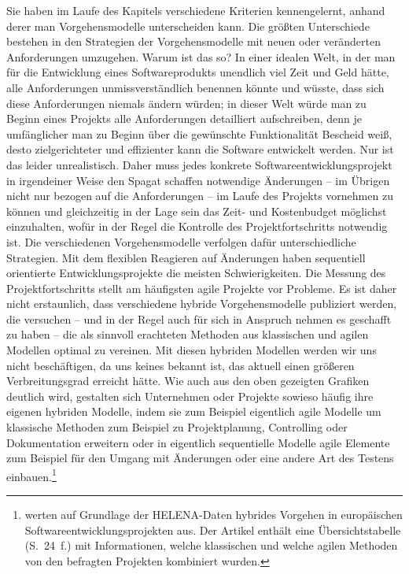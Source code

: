 
Sie haben im Laufe des Kapitels verschiedene Kriterien kennengelernt, anhand derer man Vorgehensmodelle unterscheiden kann. Die größten Unterschiede bestehen in den Strategien der Vorgehensmodelle mit neuen oder veränderten Anforderungen umzugehen. Warum ist das so? In einer idealen Welt, in der man für die Entwicklung eines Softwareprodukts unendlich viel Zeit und Geld hätte, alle Anforderungen unmissverständlich benennen könnte und wüsste, dass sich diese Anforderungen niemals ändern würden; in dieser Welt würde man zu Beginn eines Projekts alle Anforderungen detailliert aufschreiben, denn je umfänglicher man zu Beginn über die gewünschte Funktionalität Bescheid weiß, desto zielgerichteter und effizienter kann die Software entwickelt werden. Nur ist das leider unrealistisch. Daher muss jedes konkrete Softwareentwicklungsprojekt in irgendeiner Weise den Spagat schaffen notwendige Änderungen – im Übrigen nicht nur bezogen auf die Anforderungen – im Laufe des Projekts vornehmen zu können und gleichzeitig in der Lage sein das Zeit- und Kostenbudget möglichst einzuhalten, wofür in der Regel die Kontrolle des Projektfortschritts notwendig ist. Die verschiedenen Vorgehensmodelle verfolgen dafür unterschiedliche Strategien. Mit dem flexiblen Reagieren auf Änderungen haben sequentiell orientierte Entwicklungsprojekte die meisten Schwierigkeiten. Die Messung des Projektfortschritts stellt am häufigsten agile Projekte vor Probleme. Es ist daher nicht erstaunlich, dass verschiedene hybride Vorgehensmodelle publiziert werden, die versuchen – und in der Regel auch für sich in Anspruch nehmen es geschafft zu haben – die als sinnvoll erachteten Methoden aus klassischen und agilen Modellen optimal zu vereinen. Mit diesen hybriden Modellen werden wir uns nicht beschäftigen, da uns keines bekannt ist, das aktuell einen größeren Verbreitungsgrad erreicht hätte. Wie auch aus den oben gezeigten Grafiken deutlich wird, gestalten sich Unternehmen oder Projekte sowieso häufig ihre eigenen hybriden Modelle, indem sie zum Beispiel eigentlich agile Modelle um klassische Methoden zum Beispiel zu Projektplanung, Controlling oder Dokumentation erweitern oder in eigentlich sequentielle Modelle agile Elemente zum Beispiel für den Umgang mit Änderungen oder eine andere Art des Testens einbauen.\footnote{\cite{kuh19} werten auf Grundlage der HELENA-Daten \cite{kuh18} hybrides Vorgehen in europäischen Softwareentwicklungsprojekten aus. Der Artikel enthält eine Übersichtstabelle (S.~24~f.) mit Informationen, welche klassischen und welche agilen Methoden von den befragten Projekten kombiniert wurden.}

